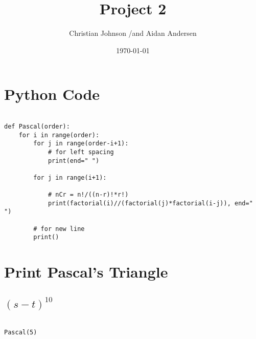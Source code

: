 \documentclass[11pt]{article}
\author{Christian Johnson /and Aidan Andersen}
\date{\today}
\title{Project 2}
\begin{document}
\maketitle
\tableofcontents

\newpage



\section{Python Code}
\label{sec:org73b4cc1}
\begin{verbatim}

def Pascal(order):
    for i in range(order):
        for j in range(order-i+1):
            # for left spacing
            print(end=" ")

        for j in range(i+1):

            # nCr = n!/((n-r)!*r!)
            print(factorial(i)//(factorial(j)*factorial(i-j)), end=" ")

        # for new line
        print()

\end{verbatim}

\section{Print Pascal's Triangle}
\label{sec:org644142c}

\subsection{\((s-t)^{10}\)}
\label{sec:org945094f}

\begin{verbatim}

Pascal(5)


\end{verbatim}
\end{document}
